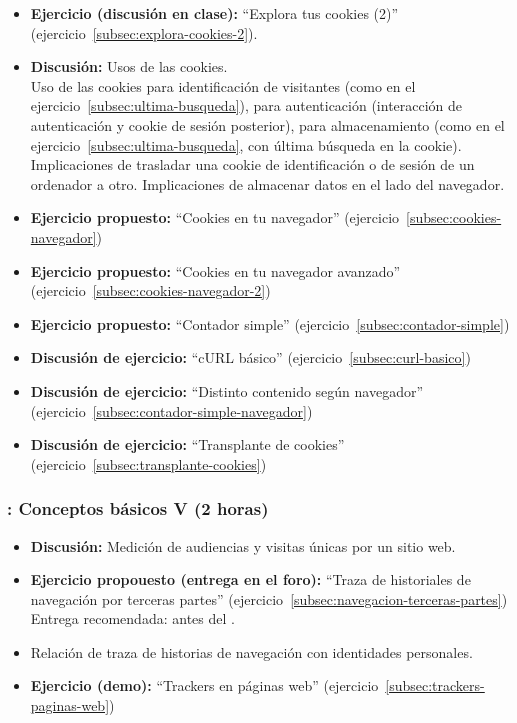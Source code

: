 \documentclass[a4paper,12pt]{article}
\begin{document}
\begin{itemize}
\item \textbf{Ejercicio (discusión en clase):} ``Explora tus cookies (2)'' (ejercicio~\ref{subsec:explora-cookies-2}).
\item \textbf{Discusión:} Usos de las cookies. \\
  Uso de las cookies para identificación de visitantes (como en el ejercicio~\ref{subsec:ultima-busqueda}), para autenticación (interacción de autenticación y cookie de sesión posterior), para almacenamiento (como en el ejercicio~\ref{subsec:ultima-busqueda}, con última búsqueda en la cookie). Implicaciones de trasladar una cookie de identificación o de sesión de un ordenador a otro. Implicaciones de almacenar datos en el lado del navegador.
\item \textbf{Ejercicio propuesto:} ``Cookies en tu navegador'' (ejercicio~\ref{subsec:cookies-navegador}) \\
\item \textbf{Ejercicio propuesto:} ``Cookies en tu navegador avanzado'' (ejercicio~\ref{subsec:cookies-navegador-2}) \\
\item \textbf{Ejercicio propuesto:} ``Contador simple'' (ejercicio~\ref{subsec:contador-simple})
\item \textbf{Discusión de ejercicio:} ``cURL básico'' (ejercicio~\ref{subsec:curl-basico})
\item \textbf{Discusión de ejercicio:} ``Distinto contenido según navegador'' (ejercicio~\ref{subsec:contador-simple-navegador})
\item \textbf{Discusión de ejercicio:} ``Transplante de cookies'' (ejercicio~\ref{subsec:transplante-cookies})
\end{itemize}

\subsubsection{\juevesF: Conceptos básicos V (2 horas)}
\label{cal:juevesF}

\begin{itemize}
\item \textbf{Discusión:} Medición de audiencias y visitas únicas por un sitio web.
\item \textbf{Ejercicio propouesto (entrega en el foro):} ``Traza de historiales de navegación por terceras partes'' (ejercicio~\ref{subsec:navegacion-terceras-partes}) \\
  Entrega recomendada: antes del \juevesG.
\item Relación de traza de historias de navegación con identidades personales.
\item \textbf{Ejercicio (demo):} ``Trackers en páginas web'' (ejercicio~\ref{subsec:trackers-paginas-web}) 
\end{itemize}
\end{document}
